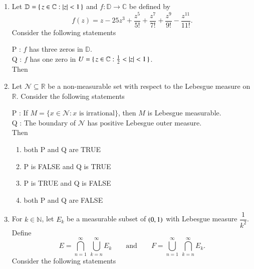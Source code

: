 \documentclass[journal,12pt,onecolumn]{IEEEtran}
\theoremstyle{remark}
\begin{document}
\begin{enumerate}[start=1, label=Q.\arabic*]
\hfill{}


\item Let $\mathbb{D}=\{\, z \in \mathbb{C} : \left\vert z\right\vert<1 \,\}$ and $f : \mathbb{D}\to \mathbb{C}$ be defined by
\[
f(z)= z - 25 z^{3} + \frac{z^{5}}{5!} + \frac{z^{7}}{7!} + \frac{z^{9}}{9!} - \frac{z^{11}}{11!}.
\]
Consider the following statements\brak{:}

P : $f$ has three zeros  in $\mathbb{D}$.\\
Q : $f$ has one zero in $U=\{\, z \in \mathbb{C} : \tfrac{1}{2}<\left\vert z\right\vert<1 \,\}$.\\

Then
\begin{enumerate}
\end{enumerate}

\hfill{}

\item Let $\mathcal{N} \subseteq \mathbb{R}$ be a non\mbox{-}measurable set with respect to the Lebesgue measure on $\mathbb{R}$. Consider the following statements\brak{:}

P : If $M=\{x \in \mathcal{N} : x \text{ is irrational}\}$, then $M$ is Lebesgue measurable.\\
Q : The boundary of $\mathcal{N}$ has positive Lebesgue outer measure.\\

Then
\begin{enumerate}
\item both P and Q are TRUE
\item P is FALSE and Q is TRUE
\item P is TRUE and Q is FALSE
\item both P and Q are FALSE
\end{enumerate}

\hfill{}


\item For $k \in \mathbb{N}$, let $E_{k}$ be a measurable subset of $\left(0,1\right)$ with Lebesgue measure $\dfrac{1}{k^{2}}$. Define
\[
E=\bigcap_{n=1}^{\infty} \ \bigcup_{k=n}^{\infty} E_{k}
\qquad \text{and} \qquad
F=\bigcup_{n=1}^{\infty} \ \bigcap_{k=n}^{\infty} E_{k}.
\]
Consider the following statements\brak{:}


\end{enumerate}
\end{document}

